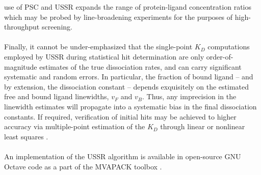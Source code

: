\begin{doublespace}
use of PSC and USSR expands the range of protein-ligand concentration ratios
which may be probed by \hnmr{} line-broadening experiments for the purposes
of high-throughput screening.
\\\\
Finally, it cannot be under-emphasized that the single-point $K_D$ computations
employed by USSR during statistical hit determination are only
order-of-magnitude estimates of the true dissociation rates, and can carry
significant systematic and random errors. In particular, the fraction of bound
ligand -- and by extension, the dissociation constant -- depends exquisitely
on the estimated free and bound ligand linewidths, $v_F$ and $v_B$. Thus, any
imprecision in the linewidth estimates will propagate into a systematic bias in
the final dissociation constants. If required, verification of initial hits may
be achieved to higher accuracy via multiple-point estimation of the $K_D$
through linear or nonlinear least squares \cite{shortridge:jcomb2008}.
\\\\
An implementation of the USSR algorithm is available in open-source GNU Octave
code as a part of the MVAPACK toolbox \cite{worley:acscb2014}.
\end{doublespace}




